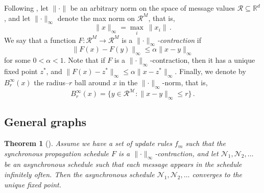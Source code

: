 \documentclass[11pt,a4paper]{article}
\newtheorem{theorem}{Theorem}
\theoremstyle{remark}
\newcommand{\Reals}{\mathbb{R}}
\newcommand{\R}{\mathcal{R}}
\newcommand{\M}{\mathcal{M}}
\newcommand{\N}{\mathcal{N}}
\newcommand{\norm}[1]{\lVert #1 \rVert}
\begin{document}
Following \cite{elidan2006residual}, let $\norm{\cdot}$ be an arbitrary norm on the space of message values $\R \subseteq \Reals^d$, and let $\norm{\cdot}_\infty$ denote the max norm on $\R^M$, that is, 
\[ \norm{x}_\infty = \max_{i}\  \norm{x_i}\,.\]
We say that a function $F \colon \R^M \to \R^M$ is a \emph{$\norm{\cdot}_\infty$-contraction} if
\[ \norm{ F(x) - F(y)}_{\infty} \le \alpha \norm{x - y}_\infty \]
for some $0 < \alpha < 1$. Note that if $F$ is a $\norm{\cdot}_\infty$-contraction, then it has a unique fixed point $z^*$, and $\norm{ F(x) - z^*}_{\infty} \le \alpha \norm{x - z^*}_\infty$.
Finally, we denote by $B^\infty_r(x)$ the radius–$r$ ball around $x$ in the $\norm{\cdot}_\infty$-norm, that is,
\[ B^\infty_r(x) = \{ y \in \R^\M  \colon \norm{x - y}_\infty \le r  \}\,. \]

\subsection{General graphs}

\begin{theorem}[\cite{Bertsekas1983}]
Assume we have a set of update rules $f_m$ such that the synchronous propagation schedule $F$ is a $\norm{\cdot}_\infty$-contraction, and let $\N_1, \N_2, \dotsc$ be an asynchronous schedule such that each message appears in the schedule infinitely often. Then the asynchronous schedule $\N_1, \N_2, \dotsc$ converges to the unique fixed point.
\end{theorem}
\end{document}
